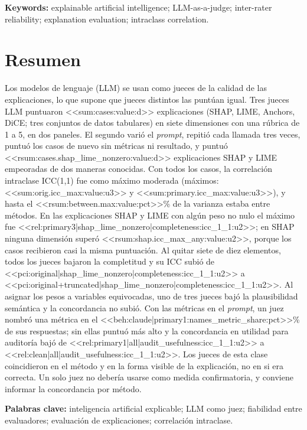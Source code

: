 \documentclass[12pt,letterpaper]{article}
\begin{document}
\noindent\textbf{Keywords:} explainable artificial intelligence; LLM-as-a-judge;
inter-rater reliability; explanation evaluation; intraclass correlation.

\section*{Resumen}
Los modelos de lenguaje (LLM) se usan como jueces de la calidad de las
explicaciones, lo que supone que jueces distintos las punt\'uan igual.
Tres jueces LLM puntuaron <<sum:cases:value:d>> explicaciones (SHAP, LIME, Anchors, DiCE; tres conjuntos de datos tabulares) en siete
dimensiones con una r\'ubrica de 1 a 5, en dos paneles. El segundo vari\'o el
\emph{prompt}, repiti\'o cada llamada tres veces, puntu\'o los casos de nuevo sin
m\'etricas ni resultado, y puntu\'o <<rsum:cases.shap_lime_nonzero:value:d>> explicaciones
SHAP y LIME empeoradas de dos maneras conocidas. Con todos los casos, la correlaci\'on
intraclase ICC(1,1) fue como m\'aximo moderada (m\'aximos:
<<sum:orig.icc_max:value:u3>> y <<sum:primary.icc_max:value:u3>>), y hasta el
<<rsum:between.max:value:pct>>\% de la varianza estaba entre m\'etodos. En las
explicaciones SHAP y LIME con alg\'un peso no nulo el m\'aximo fue
<<rel:primary3|shap_lime_nonzero|completeness:icc_1_1:u2>>; en SHAP ninguna dimensi\'on
super\'o <<rsum:shap.icc_max_any:value:u2>>, porque los casos recibieron casi la misma
puntuaci\'on. Al quitar siete de diez elementos, todos los jueces bajaron la completitud
y su ICC subi\'o de <<pci:original|shap_lime_nonzero|completeness:icc_1_1:u2>> a
<<pci:original+truncated|shap_lime_nonzero|completeness:icc_1_1:u2>>. Al asignar los pesos
a variables equivocadas, uno de tres jueces baj\'o la plausibilidad sem\'antica y la
concordancia no subi\'o. Con las m\'etricas en el \emph{prompt}, un juez nombr\'o una
m\'etrica en el <<beh:claude|primary1:names_metric_share:pct>>\% de sus respuestas; sin
ellas puntu\'o m\'as alto y la concordancia en utilidad para auditor\'ia baj\'o de
<<rel:primary1|all|audit_usefulness:icc_1_1:u2>> a
<<rel:clean|all|audit_usefulness:icc_1_1:u2>>. Los jueces de esta clase coincidieron en
el m\'etodo y en la forma visible de la explicaci\'on, no en si era correcta. Un solo juez
no deber\'ia usarse como medida confirmatoria, y conviene informar la concordancia por
m\'etodo.

\noindent\textbf{Palabras clave:} inteligencia artificial explicable; LLM como juez;
fiabilidad entre evaluadores; evaluaci\'on de explicaciones; correlaci\'on intraclase.
\end{document}
